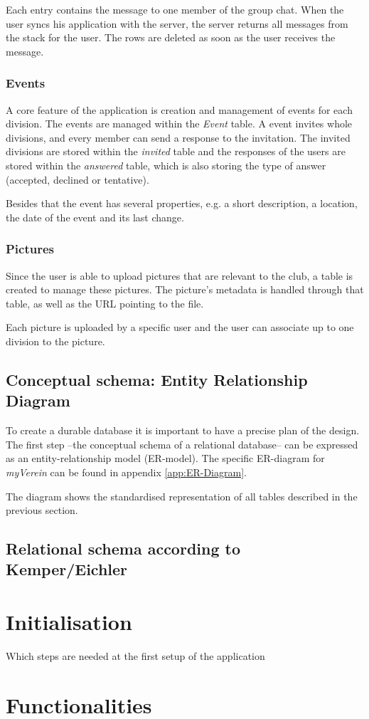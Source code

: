 Each entry contains the message to one member of the group chat. When the user syncs his application with the server, the server returns all messages from the stack for the user. The rows are deleted as soon as the user receives the message. 

\subsection{Events}
A core feature of the application is creation and management of events for each division. The events are managed within the \emph{Event} table. A event invites whole divisions, and every member can send a response to the invitation. The invited divisions are stored within the \emph{invited} table and the responses of the users are stored within the \emph{answered} table, which is also storing the type of answer (accepted, declined or tentative).

Besides that the event has several properties, e.g. a short description, a location, the date of the event and its last change.

\subsection{Pictures}
Since the user is able to upload pictures that are relevant to the club, a table is created to manage these pictures. The picture's metadata is handled through that table, as well as the URL pointing to the file.

Each picture is uploaded by a specific user and the user can associate up to one division to the picture.
 
\section{Conceptual schema: Entity Relationship Diagram}
To create a durable database it is important to have a precise plan of the design. The first step --the conceptual schema of a relational database-- can be expressed as an entity-relationship model (ER-model). The specific ER-diagram for \emph{myVerein} can be found in appendix \vref{app:ER-Diagram}. 

The diagram shows the standardised representation of all tables described in the previous section.

\section{Relational schema according to Kemper/Eichler}

\chapter{Initialisation}
Which steps are needed at the first setup of the application

\chapter{Functionalities}
